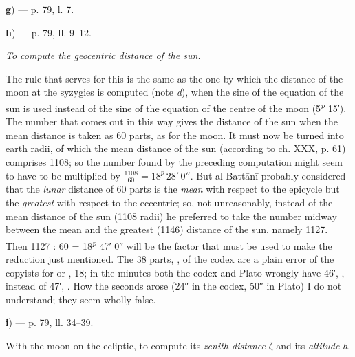 \documentclass[11pt]{article}
\begin{document}
\par\begin{center}\textbf{g}) — p. 79, l. 7.\end{center}
\par [What I said on p. 254, at the end of note \emph{d} of this chapter, must be repeated here. — Schiaparelli.]\par
\par\begin{center}\textbf{h}) — p. 79, ll. 9–12.\end{center}
\par \emph{To compute the geocentric distance of the sun.}\par
\par The rule that serves for this is the same as the one by which the distance of the moon at the syzygies is computed (note \emph{d}), when the sine of the equation of the sun is used instead of the sine of the equation of the centre of the moon (5\textsuperscript{\itshape p} 15′). The number that comes out in this way gives the distance of the sun when the mean distance is taken as 60 parts, as for the moon. It must now be turned into earth radii, of which the mean distance of the sun (according to ch. XXX, p. 61) comprises 1108; so the number found by the preceding computation might seem to have to be multiplied by $\frac{1108}{60} = 18^{p}\,28'\,0''$. But al-Battānī probably considered that the \emph{lunar} distance of 60 parts is the \emph{mean} with respect to the epicycle but the \emph{greatest} with respect to the eccentric; so, not unreasonably, instead of the mean distance of the sun (1108 radii) he preferred to take the number midway between the mean and the greatest (1146) distance of the sun, namely 1127. Then 1127 : 60 = 18\textsuperscript{\itshape p} 47′ 0″ will be the factor that must be used to make the reduction just mentioned. The 38 parts, , of the codex are a plain error of the copyists for  or , 18; in the minutes both the codex and Plato wrongly have 46′, , instead of 47′, . How the seconds arose (24″ in the codex, 50″ in Plato) I do not understand; they seem wholly false.\par
\par\begin{center}\textbf{i}) — p. 79, ll. 34–39.\end{center}
\par With the moon on the ecliptic, to compute its \emph{zenith distance} {\greekfont ζ} and its \emph{altitude} \emph{h}.\par
\end{document}
